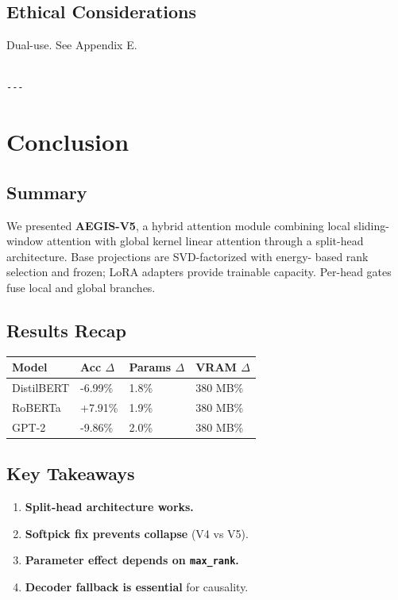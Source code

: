 \subsection{Ethical Considerations}

Dual-use. See Appendix E.
\begin{lstlisting}

---
\end{lstlisting}

\section{Conclusion}

\subsection{Summary}

We presented \textbf{AEGIS-V5}, a hybrid attention module combining local 
sliding-window attention with global kernel linear attention through a 
split-head architecture. Base projections are SVD-factorized with energy-
based rank selection and frozen; LoRA adapters provide trainable capacity. 
Per-head gates fuse local and global branches.

\subsection{Results Recap}

\begin{table}[H]
\centering
\small
\begin{tabular}{llll}
\toprule
\textbf{Model} & \textbf{Acc $\Delta$} & \textbf{Params $\Delta$} & \textbf{VRAM $\Delta$} \\
\midrule
DistilBERT & -6.99\% & 1.8\% & 380 MB\% \\
RoBERTa & +7.91\% & 1.9\% & 380 MB\% \\
GPT-2 & -9.86\% & 2.0\% & 380 MB\% \\
\bottomrule
\end{tabular}
\end{table}

\subsection{Key Takeaways}

\begin{enumerate}
\item \textbf{Split-head architecture works.}
\item \textbf{Softpick fix prevents collapse} (V4 vs V5).
\item \textbf{Parameter effect depends on \texttt{max\_rank}.}
\item \textbf{Decoder fallback is essential} for causality.

\end{enumerate}
